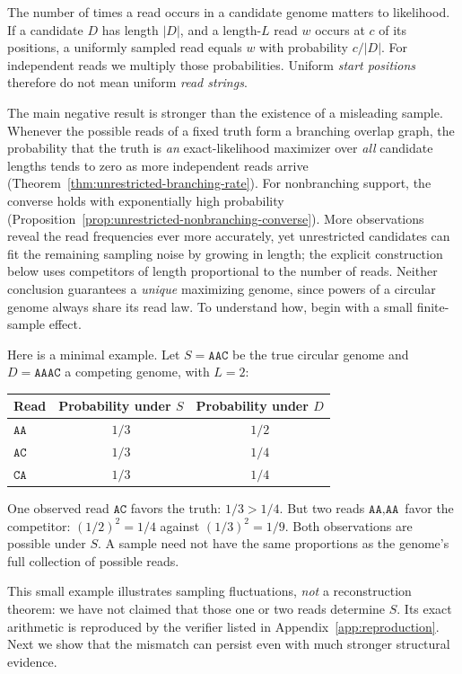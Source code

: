 The number of times a read occurs in a candidate genome matters to
likelihood. If a candidate $D$ has length $|D|$, and a length-$L$
read $w$ occurs at $c$ of its positions, a uniformly sampled read
equals $w$ with probability $c/|D|$. For independent reads we multiply
those probabilities. Uniform \emph{start positions} therefore do not
mean uniform \emph{read strings}.

The main negative result is stronger than the existence of a misleading
sample. Whenever the possible reads of a fixed truth form a branching
overlap graph, the probability that the truth is \emph{an}
exact-likelihood maximizer over \emph{all} candidate lengths tends
to zero as more independent reads arrive
(Theorem~\ref{thm:unrestricted-branching-rate}).
For nonbranching support, the converse holds with exponentially high
probability (Proposition~\ref{prop:unrestricted-nonbranching-converse}).
More observations reveal the read frequencies ever more accurately,
yet unrestricted candidates can fit the remaining sampling noise
by growing in length; the explicit construction below uses
competitors of length proportional to the number of reads.
Neither conclusion guarantees a \emph{unique} maximizing genome,
since powers of a circular genome always share its read law.
To understand how, begin with a small finite-sample effect.

Here is a minimal example. Let $S=\texttt{AAC}$ be the true circular
genome and $D=\texttt{AAAC}$ a competing genome, with $L=2$:

\begin{center}
\begin{tabular}{@{}lcc@{}}
\toprule
Read & Probability under $S$ & Probability under $D$\\
\midrule
$\texttt{AA}$ & $1/3$ & $1/2$\\
$\texttt{AC}$ & $1/3$ & $1/4$\\
$\texttt{CA}$ & $1/3$ & $1/4$\\
\bottomrule
\end{tabular}
\end{center}

One observed read $\texttt{AC}$ favors the truth: $1/3>1/4$.
But two reads $\texttt{AA},\texttt{AA}$ favor the competitor:
$(1/2)^2=1/4$ against $(1/3)^2=1/9$. Both observations are
possible under $S$. A sample need not have the same proportions
as the genome's full collection of possible reads.

This small example illustrates sampling fluctuations, \emph{not} a
reconstruction theorem: we have not claimed that those one or two reads
determine $S$. Its exact arithmetic is reproduced by the verifier
listed in Appendix~\ref{app:reproduction}. Next we show that
the mismatch can persist even with much stronger structural evidence.

